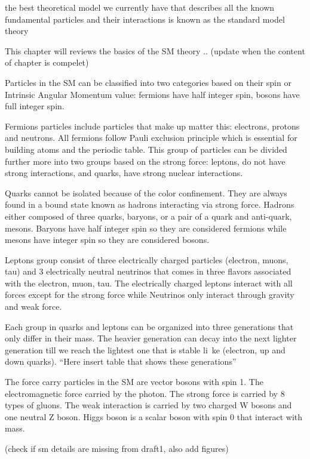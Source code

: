 
the best theoretical model we currently have that describes all the known fundamental particles and their interactions is known as the standard model theory 

This chapter will reviews the basics of the SM theory .. (update when the content of chapter is compelet)


Particles in the SM can be classified into two categories based on their spin or Intrinsic Angular Momentum value: fermions have half integer spin, bosons have full integer spin.

Fermions particles include particles that make up matter this: electrons, protons and neutrons. All fermions follow Pauli exclusion principle which is essential for building atoms and the periodic table. This group of particles can be divided further more into two groups based on the strong force: leptons, do not have strong interactions, and quarks, have strong nuclear interactions.

Quarks cannot be isolated because of the color confinement. They are always found in a bound state known as hadrons interacting via strong force. Hadrons either composed of three quarks, baryons, or a pair of a quark and anti-quark, mesons. Baryons have half integer spin so they are considered fermions while mesons have integer spin so they are considered bosons.

Leptons group consist of three electrically charged particles (electron, muons, tau) and 3 electrically neutral neutrinos that comes in three flavors associated with the electron, muon, tau. The electrically charged leptons interact with all forces except for the strong force while Neutrinos only interact through gravity and weak force.

Each group in quarks  and leptons can be organized into three generations that only differ in their mass. The heavier generation can decay into the next lighter generation till we reach the lightest one that is stable li\
ke (electron, up and  down quarks). “Here insert table that shows these generations”

The force carry particles in the SM are vector bosons with spin 1. The electromagnetic force carried by the photon. The strong force is carried by 8 types of gluons. The weak interaction is carried by two charged W bosons and one neutral Z boson. Higgs boson is a scalar boson with spin 0 that interact with mass.

(check if sm details are missing from draft1, also add figures)
